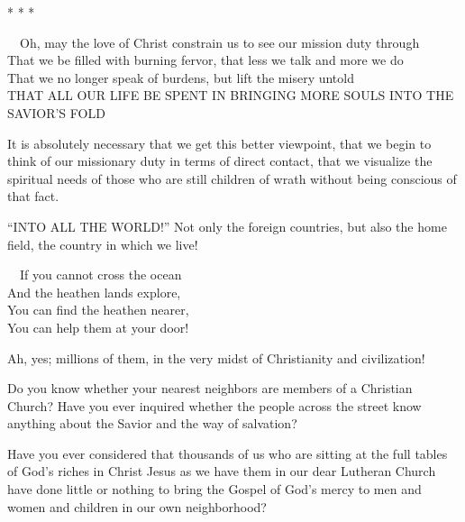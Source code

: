 \documentclass[
]{book}
\begin{document}
\begin{center} * * * \end{center}

~~Oh, may the love of Christ constrain us to see our mission duty through\\
\hspace*{0.333em}\hspace*{0.333em}That we be filled with burning fervor, that less we talk and more we do\\
\hspace*{0.333em}\hspace*{0.333em}That we no longer speak of burdens, but lift the misery untold\\
\hspace*{0.333em}\hspace*{0.333em}THAT ALL OUR LIFE BE SPENT IN BRINGING MORE SOULS INTO THE SAVIOR'S FOLD

It is absolutely necessary that we get this better viewpoint, that we begin to think of our missionary duty in terms of direct contact, that we visualize the spiritual needs of those who are still children of wrath without being conscious of that fact.

``INTO ALL THE WORLD!'' Not only the foreign countries, but also the home field, the country in which we live!

~~If you cannot cross the ocean\\
\hspace*{0.333em}\hspace*{0.333em}And the heathen lands explore,\\
\hspace*{0.333em}\hspace*{0.333em}You can find the heathen nearer,\\
\hspace*{0.333em}\hspace*{0.333em}You can help them at your door!

Ah, yes; millions of them, in the very midst of Christianity and civilization!

Do you know whether your nearest neighbors are members of a Christian Church? Have you ever inquired whether the people across the street know anything about the Savior and the way of salvation?

Have you ever considered that thousands of us who are sitting at the full tables of God's riches in Christ Jesus as we have them in our dear Lutheran Church have done little or nothing to bring the Gospel of God's mercy to men and women and children in our own neighborhood?
\end{document}
